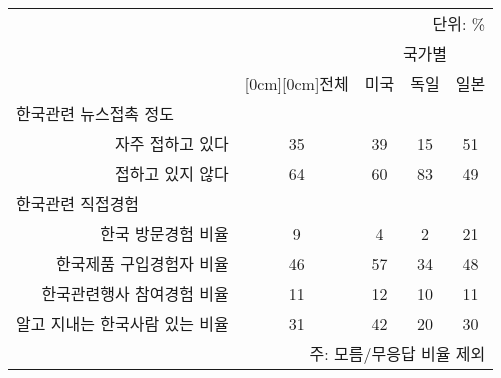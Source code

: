 \documentclass[a4paper,11pt]{article}
\begin{document}

\begin{tabular}{r|c|c|c|c}		

\multicolumn{5}{r}{\footnotesize 단위: \%}\\\cline{1-5}
 	&						& \multicolumn{3}{c}{국가별}\\
\cline{3-5}		%
	& \raisebox{1.75ex}[0cm][0cm]{전체} 	& 미국 	& 독일	& 일본	\\\hline
\multicolumn{1}{l|}{한국관련 뉴스접촉 정도}	& & & & \\\hline
자주 접하고 있다 	& 35	& 39	& 15	& 51	\\\hline 
접하고 있지 않다	& 64 	& 60	& 83	& 49	\\\hline 
\multicolumn{1}{l|}{한국관련 직접경험}	& & & & \\\hline
한국 방문경험 비율	& 9	& 4	& 2	& 21	\\\hline
한국제품 구입경험자 비율 & 46 & 57 & 34	& 48	\\\hline
한국관련행사 참여경험 비율 & 11 & 12 & 10 & 11	\\\hline
알고 지내는 한국사람 있는 비율 & 31 & 42 & 20 & 30	\\\hline
\multicolumn{5}{r}{\footnotesize 주: 모름/무응답 비율 제외}\\
\end{tabular}
\end{document}
